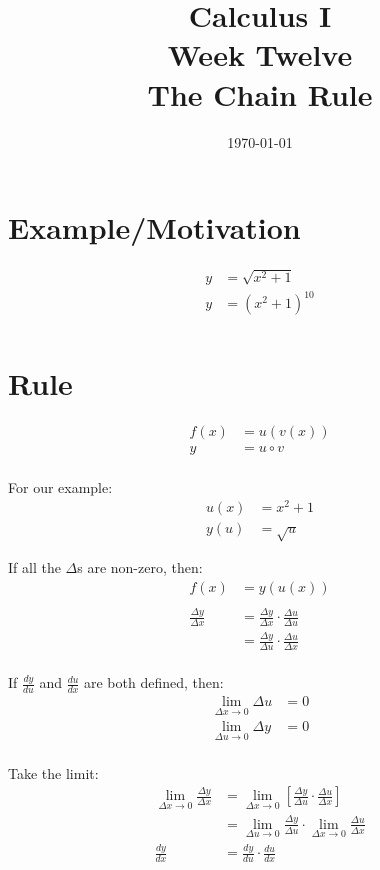 \documentclass[letterpaper, landscape]{exam}
\author{}
\date{\today}
\title{Calculus I \\ Week Twelve \\ The Chain Rule}
\begin{document}
  \maketitle
  \tableofcontents

  \section{Example/Motivation} %
  
  \begin{align*}
    y &= \sqrt{x^2 + 1} \\
    y &= \left( x^2 + 1 \right)^{10} \\
  \end{align*}

  \section{Rule} %
  
  \begin{align*}
    f(x) & = u(v(x)) \\
    y    & = u \circ v \\
  \end{align*}

  For our example:
  \begin{align*}
    u(x) & = x^2 + 1 \\
    y(u) & = \sqrt{u}
  \end{align*}

  If all the $\Delta$s are non-zero, then:
  \begin{align*}
    f(x) &= y(u(x)) \\
    \\
    \frac{\Delta y}{\Delta x} & = \frac{\Delta y}{\Delta x} \cdot \frac{\Delta u}{\Delta u} \\
                              & = \frac{\Delta y}{\Delta u} \cdot \frac{\Delta u}{\Delta x} \\
  \end{align*}

  If $\frac{dy}{du}$ and $\frac{du}{dx}$ are both defined, then:
  \begin{align*}
    \lim_{\Delta x \to 0} \Delta u &= 0 \\
    \lim_{\Delta u \to 0} \Delta y &= 0 \\
  \end{align*}

  Take the limit:
  \begin{align*}
    \lim_{\Delta x \to 0} \frac{\Delta y}{\Delta x} 
                  & = \lim_{\Delta x \to 0} \left[ \frac{\Delta y}{\Delta u} \cdot \frac{\Delta u}{\Delta x} \right] \\
                  & = \lim_{\Delta u \to 0} \frac{\Delta y}{\Delta u} \cdot \lim_{\Delta x \to 0} \frac{\Delta u}{\Delta x} \\
    \frac{dy}{dx} & = \frac{dy}{du} \cdot \frac{du}{dx} \\
  \end{align*}
\end{document}
